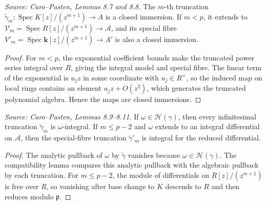 \begin{lemma}
  \label{lem:cp_infinitesimal_one_parameter}
  \textit{Source: Caro--Pasten, Lemmas 8.7 and 8.8.}
  The \(m\)-th truncation \(\widetilde\gamma_m:\operatorname{Spec}K[z]/(z^{m+1})\to A\)
  is a closed immersion.  If \(m<p\), it extends to
  \(\mathcal V_m=\operatorname{Spec}R[z]/(z^{m+1})\to\mathcal A\), and its
  special fibre
  \(V'_m=\operatorname{Spec}\mathbf k[z]/(z^{m+1})\to A'\) is also a closed
  immersion.
\end{lemma}
\begin{proof}
  For \(m<p\), the exponential coefficient bounds make the truncated power
  series integral over \(R\), giving the integral model and special fibre.
  The linear term of the exponential is \(u_jz\) in some coordinate with
  \(u_j\in R^\times\), so the induced map on local rings contains an element
  \(u_jz+O(z^2)\), which generates the truncated polynomial algebra.  Hence
  the maps are closed immersions.
\end{proof}

\begin{lemma}
  \label{lem:cp_one_parameter_omega_integral}
  \textit{Source: Caro--Pasten, Lemmas 8.9--8.11.}
  If \(\omega\in\mathcal H(\gamma)\), then every infinitesimal truncation
  \(\widetilde\gamma_m\) is \(\omega\)-integral.  If \(m\le p-2\) and
  \(\omega\) extends to an integral differential on \(\mathcal A\), then the
  special-fibre truncation \(\widetilde\gamma'_m\) is integral for the reduced
  differential.
\end{lemma}
\begin{proof}
  The analytic pullback of \(\omega\) by \(\widetilde\gamma\) vanishes because
  \(\omega\in\mathcal H(\gamma)\).  The compatibility lemma compares this
  analytic pullback with the algebraic pullback by each truncation.  For
  \(m\le p-2\), the module of differentials on \(R[z]/(z^{m+1})\) is free over
  \(R\), so vanishing after base change to \(K\) descends to \(R\) and then
  reduces modulo \(\mathfrak p\).
\end{proof}

